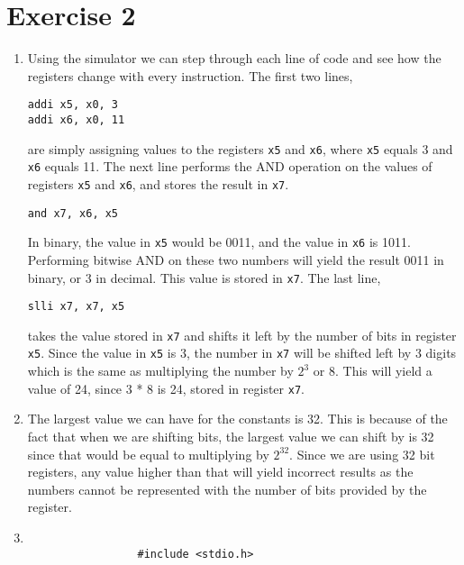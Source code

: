 \documentclass[12pt]{article}
\begin{document}
    \section*{Exercise 2}
    \begin{enumerate}
        \item
            Using the simulator we can step through each line of code and see how the registers change with every instruction. The first two lines,
            \begin{center}
                \verb+addi x5, x0, 3+ \\
                \verb+addi x6, x0, 11+
            \end{center}
            are simply assigning values to the registers \verb+x5+ and \verb+x6+, where \verb+x5+ equals 3 and \verb+x6+ equals 11. The next line performs the AND operation on the values of registers \verb+x5+ and \verb+x6+, and stores the result in \verb+x7+.
            \begin{center}
                \verb+and x7, x6, x5+
            \end{center}
            In binary, the value in \verb+x5+ would be 0011, and the value in \verb+x6+ is 1011. Performing bitwise AND on these two numbers will yield the result 0011 in binary, or 3 in decimal. This value is stored in \verb+x7+. The last line,
            \begin{center}
                \verb+slli x7, x7, x5+
            \end{center}
            takes the value stored in \verb+x7+ and shifts it left by the number of bits in register \verb+x5+. Since the value in \verb+x5+ is 3, the number in \verb+x7+ will be shifted left by 3 digits which is the same as multiplying the number by $ 2^{3} $ or 8. This will yield a value of 24, since 3 * 8 is 24, stored in register \verb+x7+.
         \item
             The largest value we can have for the constants is 32. This is because of the fact that when we are shifting bits, the largest value we can shift by is 32 since that would be equal to multiplying by $ 2^{32} $. Since we are using 32 bit registers, any value higher than that will yield incorrect results as the numbers cannot be represented with the number of bits provided by the register.
         \item
             \begin{verbatim}

                 #include <stdio.h>


\end{verbatim}
\end{enumerate}
\end{document}
